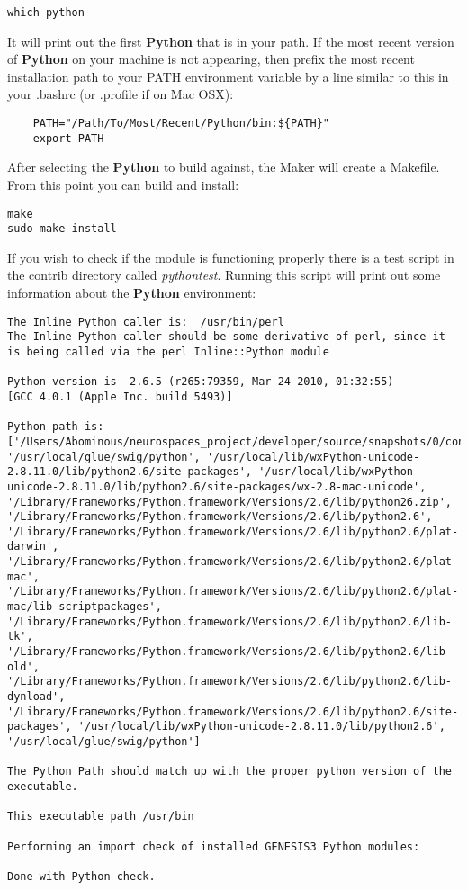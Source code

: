 \documentclass[12pt]{article}
\begin{document}
\begin{verbatim}
which python
\end{verbatim}

It will print out the first {\bf Python} that is in your path. If the most recent version of {\bf Python} on your machine is not appearing, then prefix the most recent installation path to your PATH environment variable by a line similar to this in your .bashrc (or .profile if on Mac OSX):

\begin{verbatim}
	PATH="/Path/To/Most/Recent/Python/bin:${PATH}"
	export PATH
\end{verbatim}

After selecting the {\bf Python} to build against, the Maker will create a Makefile. From this point you can build and install:

\begin{verbatim}
make
sudo make install
\end{verbatim}

If you wish to check if the module is functioning properly there is a test script in the contrib directory called {\it pythontest}. Running this script will print out some information about the {\bf Python} environment:

\begin{verbatim}
The Inline Python caller is:  /usr/bin/perl
The Inline Python caller should be some derivative of perl, since it is being called via the perl Inline::Python module

Python version is  2.6.5 (r265:79359, Mar 24 2010, 01:32:55) 
[GCC 4.0.1 (Apple Inc. build 5493)] 

Python path is: 
['/Users/Abominous/neurospaces_project/developer/source/snapshots/0/contrib', '/usr/local/glue/swig/python', '/usr/local/lib/wxPython-unicode-2.8.11.0/lib/python2.6/site-packages', '/usr/local/lib/wxPython-unicode-2.8.11.0/lib/python2.6/site-packages/wx-2.8-mac-unicode', '/Library/Frameworks/Python.framework/Versions/2.6/lib/python26.zip', '/Library/Frameworks/Python.framework/Versions/2.6/lib/python2.6', '/Library/Frameworks/Python.framework/Versions/2.6/lib/python2.6/plat-darwin', '/Library/Frameworks/Python.framework/Versions/2.6/lib/python2.6/plat-mac', '/Library/Frameworks/Python.framework/Versions/2.6/lib/python2.6/plat-mac/lib-scriptpackages', '/Library/Frameworks/Python.framework/Versions/2.6/lib/python2.6/lib-tk', '/Library/Frameworks/Python.framework/Versions/2.6/lib/python2.6/lib-old', '/Library/Frameworks/Python.framework/Versions/2.6/lib/python2.6/lib-dynload', '/Library/Frameworks/Python.framework/Versions/2.6/lib/python2.6/site-packages', '/usr/local/lib/wxPython-unicode-2.8.11.0/lib/python2.6', '/usr/local/glue/swig/python']

The Python Path should match up with the proper python version of the executable.

This executable path /usr/bin

Performing an import check of installed GENESIS3 Python modules:

Done with Python check.
\end{verbatim}
\end{document}
